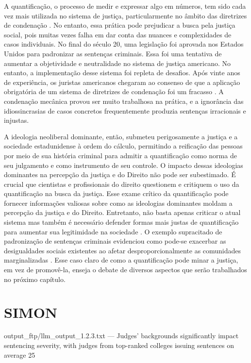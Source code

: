 A quantificação, o processo de medir e expressar algo em números, tem sido cada vez mais utilizada no sistema de justiça, particularmente no âmbito das diretrizes de condenação \cite{salais2016quantification}. No entanto, essa prática pode prejudicar a busca pela justiça social, pois muitas vezes falha em dar conta das nuances e complexidades de casos individuais. No final do século 20, uma legislação foi aprovada nos Estados Unidos para padronizar as sentenças criminais. Essa foi uma tentativa de aumentar a objetividade e neutralidade no sistema de justiça americano. No entanto, a implementação desse sistema foi repleta de desafios. Após vinte anos de experiência, os juristas americanos chegaram ao consenso de que a aplicação obrigatória de um sistema de diretrizes de condenação foi um fracasso \cite{espeland2008sociology}. A condenação mecânica provou ser muito trabalhosa na prática, e a ignorância das idiossincrasias de casos concretos frequentemente produzia sentenças irracionais e injustas.

A ideologia neoliberal dominante, então, submeteu perigosamente a justiça e a sociedade estadunidense à ordem do cálculo, permitindo a reificação das pessoas por meio de sua história criminal para admitir a quantificação como norma de seu julgamento e como instrumento de seu controle. O impacto dessas ideologias dominantes na percepção da justiça e do Direito não pode ser subestimado. É crucial que cientistas e profissionais do direito questionem e critiquem o uso da quantificação na busca da justiça. Esse exame crítico da quantificação pode fornecer informações valiosas sobre como as ideologias dominantes moldam a percepção da justiça e do Direito. Entretanto, não basta apenas criticar o atual sistema mas também é necessário defender formas mais justas de quantificação para aumentar sua legitimidade na sociedade \cite{camargo2022estado}. O exemplo supracitado de padronização de sentenças criminais evidenciou como pode-se exacerbar as desigualdades sociais existentes ao afetar desproporcionalmente as comunidades marginalizadas \cite{lynch2019narrative}. Esse caso claro de como a quantificação pode minar a justiça, em vez de promovê-la, enseja o debate de diversos aspectos que serão trabalhados no próximo capítulo.

\section{SIMON}

output_ftp/llm_output_1.2.3.txt
---
Judges' backgrounds significantly impact sentencing severity, with judges from top-ranked colleges issuing sentences on average 25%

